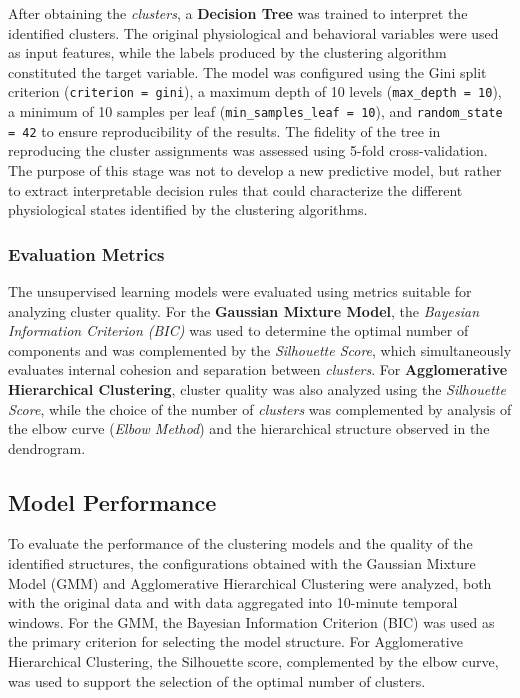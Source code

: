 \documentclass[a4paper,fleqn]{cas-sc}
\newcommand{\newtextorange}[1]{{\color{revorange}#1}}
\begin{document}
After obtaining the \textit{clusters}, a \textbf{Decision Tree} was trained to interpret the identified clusters. The original physiological and behavioral variables were used as input features, while the labels produced by the clustering algorithm constituted the target variable. The model was configured using the Gini split criterion (\texttt{criterion = gini}), a maximum depth of 10 levels (\texttt{max\_depth = 10}), a minimum of 10 samples per leaf (\texttt{min\_samples\_leaf = 10}), and \texttt{random\_state = 42} to ensure reproducibility of the results. \newtextorange{The fidelity of the tree in reproducing the cluster assignments was assessed using 5-fold cross-validation.} The purpose of this stage was not to develop a new predictive model, but rather to extract interpretable decision rules that could characterize the different physiological states identified by the clustering algorithms.

\subsubsection{Evaluation Metrics}

The unsupervised learning models were evaluated using metrics suitable for analyzing cluster quality. For the \textbf{Gaussian Mixture Model}, the \textit{Bayesian Information Criterion (BIC)} was used to determine the optimal number of components and was complemented by the \textit{Silhouette Score}, which simultaneously evaluates internal cohesion and separation between \textit{clusters}. For \textbf{Agglomerative Hierarchical Clustering}, cluster quality was also analyzed using the \textit{Silhouette Score}, while the choice of the number of \textit{clusters} was complemented by analysis of the elbow curve (\textit{Elbow Method}) and the hierarchical structure observed in the dendrogram.

\subsection{Model Performance}

To evaluate the performance of the clustering models and the quality of the identified structures, the configurations obtained with the Gaussian Mixture Model (GMM) and Agglomerative Hierarchical Clustering were analyzed, both with the original data and with data aggregated into 10-minute temporal windows. For the GMM, the Bayesian Information Criterion (BIC) was used as the primary criterion for selecting the model structure. For Agglomerative Hierarchical Clustering, the Silhouette score, complemented by the elbow curve, was used to support the selection of the optimal number of clusters.
\end{document}
